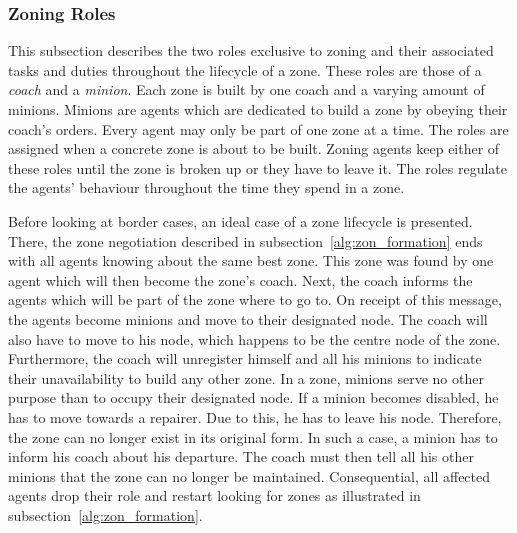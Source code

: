 \subsubsection{Zoning Roles}\label{alg:zon_roles}
This subsection describes the two roles exclusive to zoning and their associated tasks and duties throughout the lifecycle of a zone. These roles are those of a \emph{coach} and a \emph{minion}. Each zone is built by one coach and a varying amount of minions. Minions are agents which are dedicated to build a zone by obeying their coach's orders. Every agent may only be part of one zone at a time. %
The roles are assigned when a concrete zone is about to be built. Zoning agents keep either of these roles until the zone is broken up or they have to leave it. The roles regulate the agents' behaviour throughout the time they spend in a zone.


Before looking at border cases, an ideal case of a zone lifecycle is presented. There, the zone negotiation described in subsection~\ref{alg:zon_formation} ends with all agents knowing about the same best zone. This zone was found by one agent which will then become the zone's coach. Next, the coach informs the agents which will be part of the zone where to go to. On receipt of this message, the agents become minions and move to their designated node. The coach will also have to move to his node, which happens to be the centre node of the zone. Furthermore, the coach will unregister himself and all his minions to indicate their unavailability to build any other zone.
In a zone, minions serve no other purpose than to occupy their designated node. If a minion becomes disabled, he has to move towards a repairer. Due to this, he has to leave his node. Therefore, the zone can no longer exist in its original form. In such a case, a minion has to inform his coach about his departure. The coach must then tell all his other minions that the zone can no longer be maintained. Consequential, all affected agents drop their role and restart looking for zones as illustrated in subsection~\ref{alg:zon_formation}.

